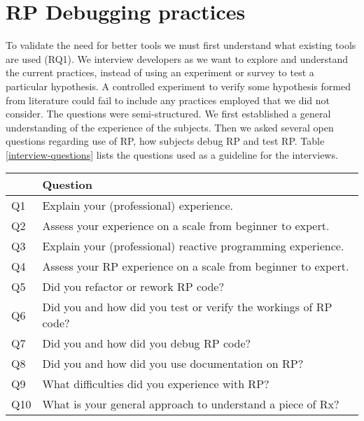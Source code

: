 \section{RP Debugging practices}
\label{section-practices}

To validate the need for better tools we must first understand what existing tools are used (RQ1).
We interview developers as we want to explore and understand the current practices, instead of using an experiment or survey to test a particular hypothesis.
A controlled experiment to verify some hypothesis formed from literature could fail to include any practices employed that we did not consider.
The questions were semi-structured. We first established a general understanding of the experience of the subjects.
Then we asked several open questions regarding use of RP, how subjects debug RP and test RP. Table \ref{interview-questions} lists the questions used as a guideline for the interviews.

\begin{table*}[]
\centering
\begin{tabular}{ll}
\hline
    & \textbf{Question}                                               \\ \hline
Q1  & Explain your (professional) experience.                         \\
Q2  & Assess your experience on a scale from beginner to expert.      \\
Q3  & Explain your (professional) reactive programming experience.    \\
Q4  & Assess your RP experience on a scale from beginner to expert.   \\
Q5  & Did you refactor or rework RP code?                             \\
Q6  & Did you and how did you test or verify the workings of RP code? \\
Q7  & Did you and how did you debug RP code?                          \\
Q8  & Did you and how did you use documentation on RP?                \\
Q9  & What difficulties did you experience with RP?                   \\
Q10 & What is your general approach to understand a piece of Rx?      \\ \hline
\end{tabular}
\caption{Interview questions}
\label{interview-questions}
\end{table*}

